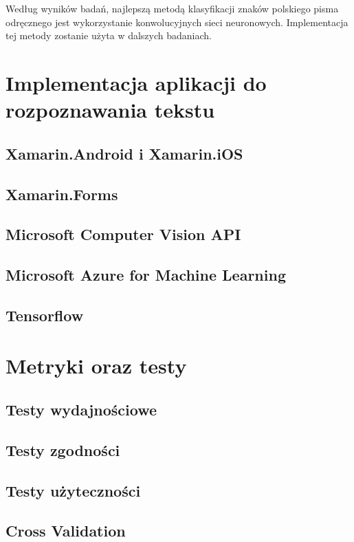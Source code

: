 \documentclass[brudnopis]{xmgr}
\begin{document}
Według wyników badań, najlepszą metodą klasyfikacji znaków polskiego pisma odręcznego jest wykorzystanie konwolucyjnych sieci neuronowych. Implementacja tej metody zostanie użyta w dalszych badaniach.

\chapter{Implementacja aplikacji do rozpoznawania tekstu}

\section{Xamarin.Android i Xamarin.iOS}

\section{Xamarin.Forms}

\section{Microsoft Computer Vision API}

\section{Microsoft Azure for Machine Learning}

\section{Tensorflow}

\chapter{Metryki oraz testy}

\section{Testy wydajnościowe}

\section{Testy zgodności}

\section{Testy użyteczności}

\section{Cross Validation}
\end{document}
